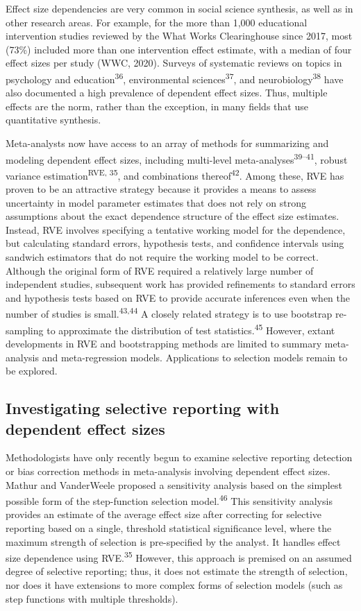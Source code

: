 \documentclass[
  american,
  man, donotrepeattitle,floatsintext]{apa7}
\begin{document}
Effect size dependencies are very common in social science synthesis, as well as in other research areas.
For example, for the more than 1,000 educational intervention studies reviewed by the What Works Clearinghouse since 2017, most (73\%) included more than one intervention effect estimate, with a median of four effect sizes per study (WWC, 2020).
Surveys of systematic reviews on topics in psychology and education\textsuperscript{36}, environmental sciences\textsuperscript{37}, and neurobiology\textsuperscript{38} have also documented a high prevalence of dependent effect sizes.
Thus, multiple effects are the norm, rather than the exception, in many fields that use quantitative synthesis.

Meta-analysts now have access to an array of methods for summarizing and modeling dependent effect sizes, including multi-level meta-analyses\textsuperscript{39--41}, robust variance estimation\textsuperscript{RVE, 35}, and combinations thereof\textsuperscript{42}.
Among these, RVE has proven to be an attractive strategy because it provides a means to assess uncertainty in model parameter estimates that does not rely on strong assumptions about the exact dependence structure of the effect size estimates.
Instead, RVE involves specifying a tentative working model for the dependence, but calculating standard errors, hypothesis tests, and confidence intervals using sandwich estimators that do not require the working model to be correct.
Although the original form of RVE required a relatively large number of independent studies, subsequent work has provided refinements to standard errors and hypothesis tests based on RVE to provide accurate inferences even when the number of studies is small.\textsuperscript{43,44}
A closely related strategy is to use bootstrap re-sampling to approximate the distribution of test statistics.\textsuperscript{45}
However, extant developments in RVE and bootstrapping methods are limited to summary meta-analysis and meta-regression models.
Applications to selection models remain to be explored.

\subsection{Investigating selective reporting with dependent effect sizes}\label{investigating-selective-reporting-with-dependent-effect-sizes}

Methodologists have only recently begun to examine selective reporting detection or bias correction methods in meta-analysis involving dependent effect sizes.
Mathur and VanderWeele proposed a sensitivity analysis based on the simplest possible form of the step-function selection model.\textsuperscript{46}
This sensitivity analysis provides an estimate of the average effect size after correcting for selective reporting based on a single, threshold statistical significance level, where the maximum strength of selection is pre-specified by the analyst.
It handles effect size dependence using RVE.\textsuperscript{35}
However, this approach is premised on an assumed degree of selective reporting; thus, it does not estimate the strength of selection, nor does it have extensions to more complex forms of selection models (such as step functions with multiple thresholds).
\end{document}
